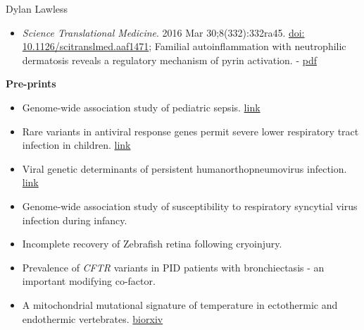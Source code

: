 \documentclass[11pt,a4paper]{article}
\begin{document}
\begin{cv}{Dylan Lawless}
\begin{itemize}[leftmargin=*]
\item \emph{Science Translational Medicine}. 2016 Mar 30;8(332):332ra45. 
\href{https://doi.org/10.1126/scitranslmed.aaf1471}{doi: 10.1126/scitranslmed.aaf1471};
Familial autoinflammation with neutrophilic dermatosis reveals a regulatory mechanism of pyrin activation.
- \href{https://lawlessgenomics.com/resume/pdf/2016MastersScienceTM_Familial\%20autoinflammation\%20with\%20neutrophilic\%20dermatosis\%20reveals\%20a\%20regulatory\%20mechanism\%20of\%20pyrin\%20activation\%20-\%20Science\%20Translational\%20Medicine.pdf}{pdf}

\end{itemize}
\textbf{Pre-prints}

\begin{itemize}[leftmargin=*]
\item Genome-wide association study of pediatric sepsis. 
\href{https://www.overleaf.com/project/61eff91e8fa2f73ce275d18d}{link} 

\item Rare variants in antiviral response genes permit severe lower respiratory tract infection in children. 
\href{https://www.overleaf.com/project/61e671c889b3851c7165a794}{link} 

\item Viral genetic determinants of persistent humanorthopneumovirus infection. 
\href{https://www.overleaf.com/project/61718a4e077acc3d20ee68f1}{link} 

\item Genome-wide association study of susceptibility to respiratory syncytial virus infection during infancy.

\item Incomplete recovery of Zebrafish retina following cryoinjury. 

\item Prevalence of \textit{CFTR} variants in PID patients with bronchiectasis - an important modifying co-factor.

\item  A mitochondrial mutational signature of temperature in ectothermic and endothermic vertebrates. 
\href{https://www.biorxiv.org/content/10.1101/2020.07.25.221184v2}{biorxiv}


\end{itemize}
\end{cv}
\end{document}

